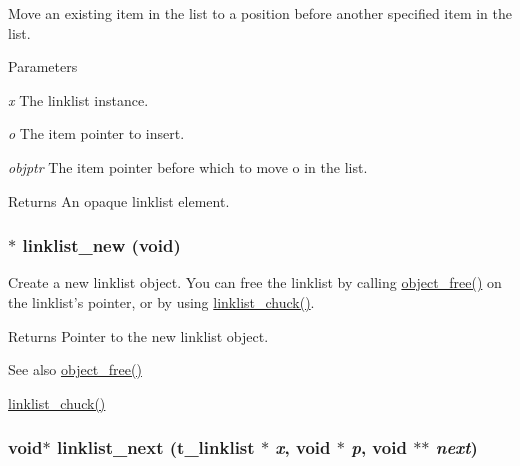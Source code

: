 Move an existing item in the list to a position before another specified item in the list. 
\begin{DoxyParams}{Parameters}
\item[{\em x}]The linklist instance. \item[{\em o}]The item pointer to insert. \item[{\em objptr}]The item pointer before which to move o in the list.\end{DoxyParams}
\begin{DoxyReturn}{Returns}
An opaque linklist element. 
\end{DoxyReturn}
\hypertarget{group__linklist_ga62dba349046e7f84cf34c9c80f04d44a}{
\subsubsection[{linklist\_\-new}]{$\ast$ linklist\_\-new (void)}}
\label{group__linklist_ga62dba349046e7f84cf34c9c80f04d44a}


Create a new linklist object. You can free the linklist by calling \hyperlink{group__obj_ga3759846cb356195532c41e35b87522ee}{object\_\-free()} on the linklist's pointer, or by using \hyperlink{group__linklist_ga033f4bf2a9f806e168697b5ce0f6331e}{linklist\_\-chuck()}.

\begin{DoxyReturn}{Returns}
Pointer to the new linklist object.
\end{DoxyReturn}
\begin{DoxySeeAlso}{See also}
\hyperlink{group__obj_ga3759846cb356195532c41e35b87522ee}{object\_\-free()} 

\hyperlink{group__linklist_ga033f4bf2a9f806e168697b5ce0f6331e}{linklist\_\-chuck()} 
\end{DoxySeeAlso}
\hypertarget{group__linklist_ga9d66d4fd900d9cdd13f7520094fb1837}{
\subsubsection[{linklist\_\-next}]{\setlength{\rightskip}{0pt plus 5cm}void$\ast$ linklist\_\-next ({\bf t\_\-linklist} $\ast$ {\em x}, \/  void $\ast$ {\em p}, \/  void $\ast$$\ast$ {\em next})}}
\label{group__linklist_ga9d66d4fd900d9cdd13f7520094fb1837}


